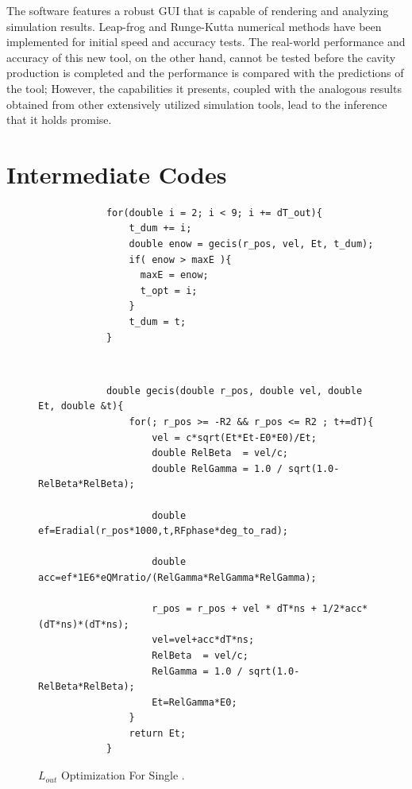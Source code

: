 \documentclass[a4paper,oneside,12pt]{report}
\numberwithin{equation}{chapter}
\begin{document}
The software features a robust GUI that is capable of rendering and analyzing simulation results.
Leap-frog and Runge-Kutta numerical methods have been implemented for initial speed and accuracy tests.
The real-world performance and accuracy of this new tool, on the other hand, cannot be tested
before the cavity production is completed and the performance is compared with the predictions of the tool;
However, the capabilities it presents, coupled with the analogous results obtained from other extensively utilized simulation tools, 
lead to the inference that it holds promise.

\newpage


\appendix
\chapter{Intermediate Codes} \label{appendix:intermediate_codes}
\begin{figure}[H]
    \centering
    \begin{minipage}{\textwidth}
        \centering
        \begin{verbatim}
            for(double i = 2; i < 9; i += dT_out){
                t_dum += i;
                double enow = gecis(r_pos, vel, Et, t_dum);
                if( enow > maxE ){
                  maxE = enow;
                  t_opt = i;
                }
                t_dum = t;
            }
        \end{verbatim}
    \end{minipage} 
    \\
    \vspace{10pt}
    \begin{minipage}{\textwidth}
        \centering
        \begin{verbatim}
            double gecis(double r_pos, double vel, double Et, double &t){
                for(; r_pos >= -R2 && r_pos <= R2 ; t+=dT){
                    vel = c*sqrt(Et*Et-E0*E0)/Et;
                    double RelBeta  = vel/c;
                    double RelGamma = 1.0 / sqrt(1.0-RelBeta*RelBeta);
                
                    double ef=Eradial(r_pos*1000,t,RFphase*deg_to_rad);
                
                    double acc=ef*1E6*eQMratio/(RelGamma*RelGamma*RelGamma); 
                
                    r_pos = r_pos + vel * dT*ns + 1/2*acc*(dT*ns)*(dT*ns);
                    vel=vel+acc*dT*ns;
                    RelBeta  = vel/c;
                    RelGamma = 1.0 / sqrt(1.0-RelBeta*RelBeta);
                    Et=RelGamma*E0; 
                }
                return Et;
            }
        \end{verbatim}
    \end{minipage}
    \vspace{20pt}
    \caption{$L_{out}$ Optimization For Single \e.}
    \label{fig:lout_opt_single_e}
\end{figure}
\end{document}
